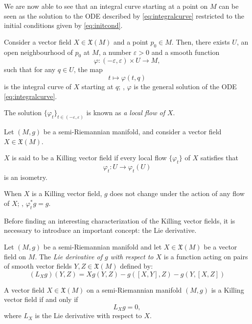 We are now able to see that an integral curve starting at a point on $M$ can be seen as the solution to the \ac{ODE} described by \autoref{eq:integralcurve} restricted to the initial conditions given by \autoref{eq:initcond}.

\begin{lemma}
	Consider a vector field $X \in \mathfrak{X}(M)$ and a point $p_0 \in M$. Then, there exists $U$, an open neighbourhood of $p_0$ at $M$, a number $\varepsilon > 0$ and a smooth function
	\[
		\varphi \colon (-\varepsilon, \varepsilon) \times U \to M,
	\]
	such that for any $q \in U$, the map
	\[
		t \mapsto \varphi(t,q)
	\]
	is the integral curve of $X$ starting at $q$; \ie, $\varphi$ is the general solution of the \ac{ODE} \ref{eq:integralcurve}.
	
	The solution $\{\varphi_t\}_{t \in (-\varepsilon, \varepsilon)}$ is known as \emph{a local flow of $X$}.
\end{lemma}

\begin{definition}
	Let $(M,g)$ be a semi-Riemannian manifold, and consider a vector field $X\in\mathfrak{X}(M)$.
	
	$X$ is said to be a Killing vector field if every local flow $\{\varphi_t\}$ of $X$ satisfies that
	\[
		\varphi_t \colon U \to \varphi_t(U)
	\]
	is an isometry.
\end{definition}

When $X$ is a Killing vector field, $g$ does not change under the action of any flow of $X$; \ie, $\varphi^*_t g = g$.

Before finding an interesting characterization of the Killing vector fields, it is necessary to introduce an important concept: the Lie derivative.

\begin{definition}
	Let $(M,g)$ be a semi-Riemannian manifold and let $X\in\mathfrak{X}(M)$ be a vector field on $M$. The \emph{Lie derivative of $g$ with respect to $X$} is a function acting on pairs of smooth vector fields $Y,Z \in \mathfrak{X}(M)$ defined by:
	\begin{equation}
	\label{eq:liederivative}
		(L_Xg)(Y,Z) = Xg(Y,Z) - g([X,Y],Z) - g(Y,[X,Z])
	\end{equation}
\end{definition}

\begin{proposition}
	\label{pro:Killingchar}
	A vector field $X \in \mathfrak{X}(M)$ on a semi-Riemannian manifold $(M,g)$ is a Killing vector field if and only if
	\[
		L_X g = 0,
	\]
	where $L_X$ is the Lie derivative with respect to $X$.
\end{proposition}


